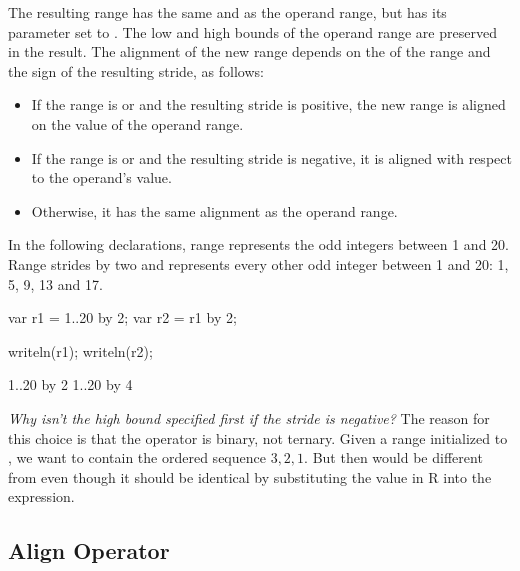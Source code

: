 The resulting range has the same  and  as the
operand range, but has its  parameter set to .
The low and high bounds of the operand range are preserved in the result.
The alignment of the new range depends on the  of the range
and the sign of the resulting stride, as follows:
\begin{itemize}
\item If the range is  or  and  the resulting stride is positive, the new range is aligned on
the  value of the operand range.  
\item If the range
is  or  and  the resulting stride is
negative, it is aligned with respect to the operand's  value.
\item Otherwise, it has the same alignment as the operand range.
\end{itemize}

\begin{example}
In the following declarations, range  represents the odd integers
between 1 and 20. Range  strides  by two and represents
every other odd integer between 1 and 20: 1, 5, 9, 13 and 17.
\begin{chapelpre}
\end{chapelpre}
\begin{chapel}
var r1 = 1..20 by 2;
var r2 = r1 by 2;
\end{chapel}
\begin{chapelpost}
writeln(r1);
writeln(r2);
\end{chapelpost}
\begin{chapeloutput}
1..20 by 2
1..20 by 4
\end{chapeloutput}
\end{example}

\begin{rationale}
{\it Why isn't the high bound specified first if the stride is
negative?}  The reason for this choice is that the  operator
is binary, not ternary.  Given a range  initialized
to , we want  to contain the ordered sequence
$3,2,1$.  But then  would be different from  even though it should be identical by substituting the value in
R into the expression.
\end{rationale}


\subsection{Align Operator}
\label{Align_Operator}


